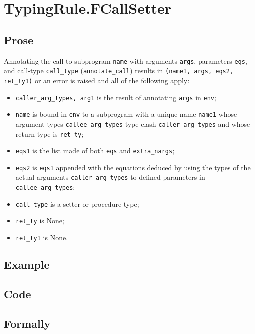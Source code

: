 \documentclass{book}
\begin{document}
\section{TypingRule.FCallSetter \label{sec:TypingRule.FCallSetter}}

  \subsection{Prose}
  Annotating the call to subprogram \texttt{name} with arguments \texttt{args},
  parameters \texttt{eqs}, and call-type \texttt{call\_type}
  (\texttt{annotate\_call}) results in \texttt{(name1, args, eqs2, ret\_ty1)}
  or an error is raised and all of the following apply:
  \begin{itemize}
    \item \texttt{caller\_arg\_types, arg1} is the result of annotating
      \texttt{args} in \texttt{env};
    \item \texttt{name} is bound in \texttt{env} to a subprogram with a unique
      name \texttt{name1} whose argument types \texttt{callee\_arg\_types}
      type-clash \texttt{caller\_arg\_types} and whose return type is
      \texttt{ret\_ty};
    \item \texttt{eqs1} is the list made of both \texttt{eqs} and
      \texttt{extra\_nargs};
    \item \texttt{eqs2} is \texttt{eqs1} appended with the equations deduced by
      using the types of the actual arguments \texttt{caller\_arg\_types} to
      defined parameters in \\ \texttt{callee\_arg\_types};
    \item \texttt{call\_type} is a setter or procedure type;
    \item \texttt{ret\_ty} is None;
    \item \texttt{ret\_ty1} is None.
  \end{itemize}

  \subsection{Example}

  \subsection{Code}

\begin{emptyformal}
    \subsection{Formally}
\end{emptyformal}
\end{document}
